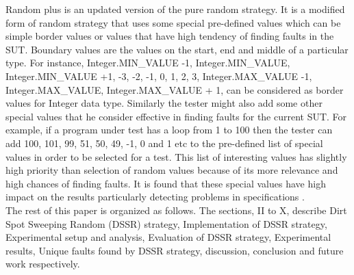 Random plus \cite{Leitner2007} is an updated version of the pure random strategy. It is a modified form of random strategy that uses some special pre-defined values which can be simple border values or values that have high tendency of finding faults in the SUT. Boundary values \cite{Beizer1990} are the values on the start, end and middle of a particular type. For instance,  Integer.MIN\_VALUE -1, Integer.MIN\_VALUE, Integer.MIN\_VALUE +1, -3, -2, -1, 0, 1, 2, 3, Integer.MAX\_VALUE -1, Integer.MAX\_VALUE, Integer.MAX\_VALUE + 1, can be considered as border values for Integer data type. Similarly the tester might also add some other special values that he consider effective in finding faults for the current SUT. For example, if a program under test has a loop from 1 to 100 then the tester can add 100, 101, 99, 51, 50, 49, -1, 0 and 1 etc to the pre-defined list of special values in order to be selected for a test. This list of interesting values has slightly high priority than selection of random values because of its more relevance and high chances of finding faults. It is found that these special values have high impact on the results particularly detecting problems in specifications \cite{Ciupa2008}.\\

The rest of this paper is organized as follows. The sections, II to X, describe Dirt Spot Sweeping Random (DSSR) strategy, Implementation of DSSR strategy, Experimental setup and analysis, Evaluation of DSSR strategy, Experimental results, Unique faults found by DSSR strategy, discussion, conclusion and future work respectively.\\ 